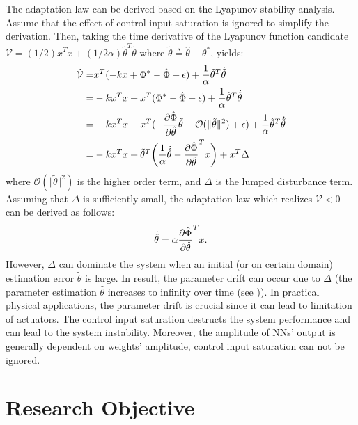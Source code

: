 The adaptation law can be derived based on the Lyapunov stability analysis.
Assume that the effect of control input saturation is ignored to simplify the derivation.
Then, taking the time derivative of the Lyapunov function candidate $\mathcal V = (1/2)x^Tx+(1/2\alpha)\tilde\theta^T\tilde\theta$ where $\tilde\theta\triangleq \hat\theta-\theta^*$, yields:
\begin{equation}
    \begin{aligned}
        \dot{\mathcal V}
        =& x^T ( - kx + \Phi^* - \hat\Phi + \epsilon ) + {1\over\alpha}\tilde\theta^T \dot{\tilde\theta}
        \\
        =& - k x^Tx + x^T(\Phi^* - \hat\Phi + \epsilon) + {1\over\alpha}\tilde\theta^T \dot{\tilde\theta}
        \\
        =& - k x^Tx + x^T( -{\partial \hat\Phi\over\partial \hat\theta}\tilde\theta + \mathcal O(\Vert\tilde\theta\Vert^2) +\epsilon) + {1\over\alpha}\tilde\theta^T \dot{\tilde\theta}
        \\
        =& - k x^Tx +\tilde\theta^T
        \bigg(
            {1\over \alpha} \dot{\hat\theta} - {\partial \hat\Phi\over\partial \hat\theta}^T x
        \bigg)
        + x^T\Delta
    \end{aligned}
\end{equation}
where $\mathcal O (\Vert\tilde\theta\Vert^2)$ is the higher order term, and $\Delta$ is the lumped disturbance term.
Assuming that $\Delta$ is sufficiently small, the adaptation law which realizes $\dot{\mathcal V}<0$ can be derived as follows:
\begin{equation}
    \dot{\hat\theta} = \alpha {\partial \hat\Phi\over\partial \hat\theta}^T x
    .
\end{equation}
However, $\Delta$ can dominate the system when an initial (or on certain domain) estimation error $\tilde\theta$ is large.
In result, the parameter drift can occur due to $\Delta$ (\ie the parameter estimation $\hat\theta$ increases to infinity over time (see \cite{RN6})).
In practical physical applications, the parameter drift is crucial since it can lead to limitation of actuators.
The control input saturation destructs the system performance and can lead to the system instability.
Moreover, the amplitude of NNs' output is generally dependent on weights' amplitude, control input saturation can not be ignored.

\section{Research Objective} \label{chap1:sec:research objective}

